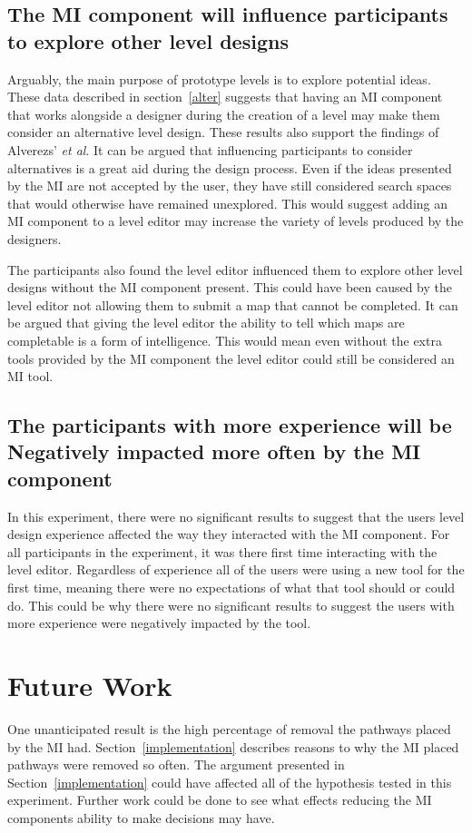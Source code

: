 \documentclass[journal]{IEEEtran}
\begin{document}
\subsection{The MI component will influence participants to explore other level designs}\label{altDiss}
Arguably, the main purpose of prototype levels is to explore potential ideas. These data described in section~\ref{alter} suggests that having an MI component that works alongside a designer during the creation of a level may make them consider an alternative level design. These results also support the findings of Alverezs' \textit{et al}\cite{alvarez2018fostering}. It can be argued that influencing participants to consider alternatives is a great aid during the design process. Even if the ideas presented by the MI are not accepted by the user, they have still considered search spaces that would otherwise have remained unexplored. This would suggest adding an MI component to a level editor may increase the variety of levels produced by the designers.

The participants also found the level editor influenced them to explore other level designs without the MI component present. This could have been caused by the level editor not allowing them to submit a map that cannot be completed. It can be argued that giving the level editor the ability to tell which maps are completable is a form of intelligence. This would mean even without the extra tools provided by the MI component the level editor could still be considered an MI tool. 

\subsection{The participants with more experience will be Negatively impacted more often by the MI component}
In this experiment, there were no significant results to suggest that the users level design experience affected the way they interacted with the MI component. For all participants in the experiment, it was there first time interacting with the level editor. Regardless of experience all of the users were using a new tool for the first time, meaning there were no expectations of what that tool should or could do. This could be why there were no significant results to suggest the users with more experience were negatively impacted by the tool.

\section{Future Work}
One unanticipated result is the high percentage of removal the pathways placed by the MI had. Section~\ref{implementation} describes reasons to why the MI placed pathways were removed so often. The argument presented in Section~\ref{implementation} could have affected all of the hypothesis tested in this experiment. Further work could be done to see what effects reducing the MI components ability to make decisions may have.
\end{document}
